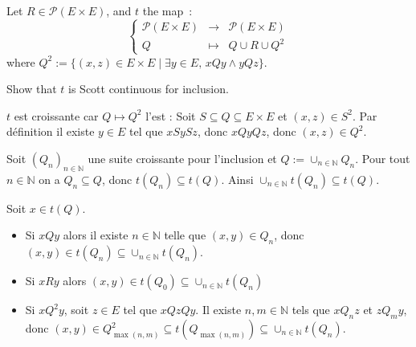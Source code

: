 \documentclass[a4paper,11pt]{exam}
\newcommand{\N}{\mathbb{N}}
\begin{document}
\begin{questions}
		\question
		Let $R \in \mathcal{P}(E \times E)$,
		and $t$ the map~: 
		\[
		\left\{
		\begin{array}{rcl}
		\mathcal{P}(E \times E) & \to & \mathcal{P}(E \times E)\\
		Q &\mapsto& Q \cup R \cup Q^2
		\end{array}
		\right.
		\]
		where $Q^2 := \{(x,z) \in E \times E\mid \exists y \in E,\,xQy \wedge yQz\}$.
		
		Show that $t$ is Scott continuous for inclusion.
		
		\begin{solution}
			$t$ est croissante car $Q \mapsto Q^2$ l'est :
			Soit $S \subseteq Q \subseteq E \times E$ et $(x,z) \in S^2$.
			Par définition il existe $y \in E$ tel que $xSySz$, donc $xQyQz$, donc
			$(x,z) \in Q^2$.
			
			Soit $(Q_n)_{n \in \N}$ une suite croissante pour l'inclusion et
			$Q := \cup_{n \in \N}Q_n$.
			Pour tout $n \in \N$ on a $Q_n \subseteq Q$, donc
			$t(Q_n) \subseteq t(Q)$.
			Ainsi $\cup_{n \in \N}t(Q_n) \subseteq t(Q)$.
			
			Soit $x \in t(Q)$.
			\begin{itemize}
				\item Si $xQy$ alors il existe $n \in \N$ telle que $(x,y) \in Q_n$, donc
				$(x,y) \in t(Q_n) \subseteq \cup_{n \in \N}t(Q_n)$.
				
				\item Si $xRy$ alors $(x,y) \in t(Q_0) \subseteq \cup_{n \in \N}t(Q_n)$
				
				\item Si $xQ^2y$, soit $z \in E$ tel que $xQzQy$. Il existe $n,m \in \N$
				tels que $xQ_nz$ et $zQ_my$, donc $(x,y) \in Q_{\max(n,m)}^2 \subseteq
				t(Q_{\max(n,m)})  \subseteq \cup_{n \in \N}t(Q_n)$.
			\end{itemize}
		\end{solution}
		
	\end{questions}
	
\end{document}
